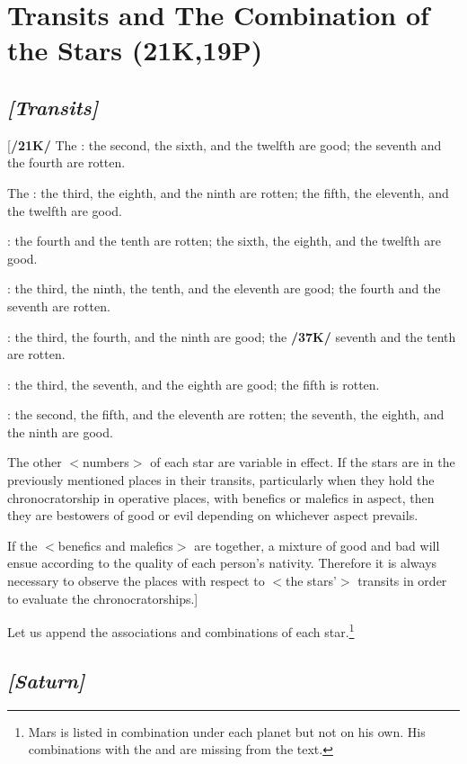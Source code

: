 \section{Transits and The Combination of the Stars (21K,19P)}

\subsection{\textit{[Transits]}}
[\textbf{/21K/}
The \Sun: the second, the sixth, and the twelfth are good; the seventh and the fourth are rotten.

The \Moon: the third, the eighth, and the ninth are rotten; the fifth, the eleventh, and the twelfth are good.

\Saturn: the fourth and the tenth are rotten; the sixth, the eighth, and the twelfth are good.

\Jupiter: the third, the ninth, the tenth, and the eleventh are good; the fourth and the seventh are rotten.

\Mars: the third, the fourth, and the ninth are good; the \textbf{/37K/} seventh and the tenth are rotten.

\Venus: the third, the seventh, and the eighth are good; the fifth is rotten.

\Mercury: the second, the fifth, and the eleventh are rotten; the seventh, the eighth, and the ninth are good.

\mndl[0.2cm]
The other $<$numbers$>$ of each star are variable in effect.
If the stars are in the previously mentioned places in their transits, particularly when they hold the chronocratorship in operative places, with benefics or malefics in aspect, then they are bestowers of good or evil depending on whichever aspect prevails. 

\mnm[0.3cm]
If the $<$benefics and malefics$>$ are together, a mixture of good and bad will ensue according to the quality of each person’s nativity. Therefore it is always necessary to
observe the places with respect to $<$the stars’$>$ transits in order to evaluate the chronocratorships.]

Let us append the associations and combinations of each star.\enlargethispage{2\baselineskip}\footnote{Mars is listed in combination under each planet but not on his own. His combinations with the \Sun\xspace and \Moon\xspace are missing from the text.}



\secbr
\subsection{\textit{[Saturn]}}

